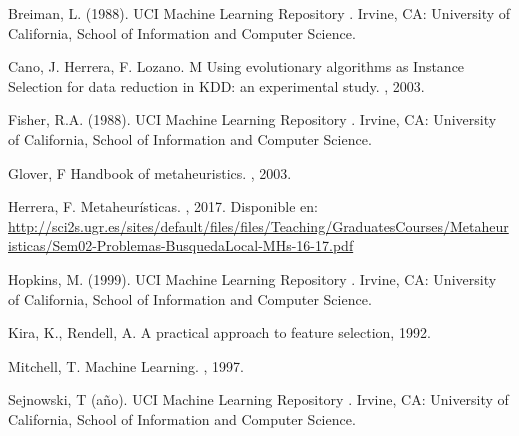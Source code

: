 \documentclass{ci5652}
\begin{document}
\newpage
\small


\begin{thebibliography}{99}

Breiman, L. (1988). UCI Machine Learning Repository
.
\newblock Irvine, CA: University of California, School of Information and Computer Science.

Cano, J. Herrera, F. Lozano. M
\newblock Using evolutionary algorithms as Instance Selection for data
reduction in KDD: an experimental study.
, 2003.

Fisher, R.A. (1988). UCI Machine Learning Repository
.
\newblock Irvine, CA: University of California, School of Information and Computer Science.

Glover, F
\newblock Handbook of metaheuristics.
, 2003.

Herrera, F.
\newblock Metaheurísticas.
, 2017. Disponible en:
\url{http://sci2s.ugr.es/sites/default/files/files/Teaching/GraduatesCourses/Metaheuristicas/Sem02-Problemas-BusquedaLocal-MHs-16-17.pdf}

Hopkins, M. (1999). UCI Machine Learning Repository
.
\newblock Irvine, CA: University of California, School of Information and Computer Science.

Kira, K., Rendell, A.
\newblock A practical approach to feature selection, 1992.

Mitchell, T.
\newblock Machine Learning.
, 1997.

Sejnowski, T (año). UCI Machine Learning Repository
.
\newblock Irvine, CA: University of California, School of Information and Computer Science.


\end{thebibliography}
\end{document}
